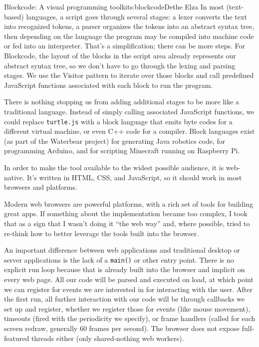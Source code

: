 \begin{aosachapter}{Blockcode: A visual programming toolkit}{s:blockcode}{Dethe Elza}
In most (text-based) languages, a script goes through several stages: a
lexer converts the text into recognized tokens, a parser organizes the
tokens into an abstract syntax tree, then depending on the language the
program may be compiled into machine code or fed into an interpreter.
That's a simplification; there can be more steps. For Blockcode, the
layout of the blocks in the script area already represents our abstract
syntax tree, so we don't have to go through the lexing and parsing
stages. We use the Visitor pattern to iterate over those blocks and call
predefined JavaScript functions associated with each block to run the
program.

There is nothing stopping us from adding additional stages to be more
like a traditional language. Instead of simply calling associated
JavaScript functions, we could replace \texttt{turtle.js} with a block
language that emits byte codes for a different virtual machine, or even
C++ code for a compiler. Block languages exist (as part of the Waterbear
project) for generating Java robotics code, for programming Arduino, and
for scripting Minecraft running on Raspberry Pi.

\label{web-applications}

In order to make the tool available to the widest possible audience, it
is web-native. It's written in HTML, CSS, and JavaScript, so it should
work in most browsers and platforms.

Modern web browsers are powerful platforms, with a rich set of tools for
building great apps. If something about the implementation became too
complex, I took that as a sign that I wasn't doing it ``the web way''
and, where possible, tried to re-think how to better leverage the tools
built into the browser.

An important difference between web applications and traditional desktop
or server applications is the lack of a \texttt{main()} or other entry
point. There is no explicit run loop because that is already built into
the browser and implicit on every web page. All our code will be parsed
and executed on load, at which point we can register for events we are
interested in for interacting with the user. After the first run, all
further interaction with our code will be through callbacks we set up
and register, whether we register those for events (like mouse
movement), timeouts (fired with the periodicity we specify), or frame
handlers (called for each screen redraw, generally 60 frames per
second). The browser does not expose full-featured threads either (only
shared-nothing web workers).


\end{aosachapter}
